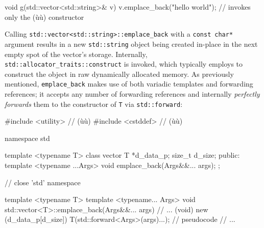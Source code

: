 \begin{emcppslisting}[emcppsbatch=e11]
void g(std::vector<std::string>& v)
{
    v.emplace_back("hello world");
        // invokes only the (ù{}ù) constructor
}
\end{emcppslisting}

\noindent Calling \lstinline!std::vector<std::string>::emplace_back! with a
\lstinline!const!~\lstinline!char*! argument results in a new
\lstinline!std::string! object being created in-place in the next empty
spot of the vector's storage. Internally,
\lstinline!std::allocator_traits::construct! is invoked, which typically
employs  to construct the object in raw
dynamically allocated memory. As previously mentioned,
\lstinline!emplace_back! makes use of both variadic
templates and forwarding references; it accepts any
number of forwarding references and internally \textit{perfectly forwards} them
to the constructor of \lstinline!T! via \lstinline!std::forward!:

\begin{emcppshiddenlisting}[emcppsbatch=e12]
#include <utility>  // (ù{}ù)                                           
#include <cstddef>  // (ù{}ù)                                            
                                                                                
namespace std {                                                                 
                                                                                
template <typename T>                                                           
class vector                                                                    
{                                                                               
    T      *d_data_p;                                                           
    size_t  d_size;                                                             
public:                                                                         
    template <typename ...Args>                                                 
    void emplace_back(Args&&... args);                                          
};                                                                              
                                                                                
} // close 'std' namespace
\end{emcppshiddenlisting}
\begin{emcppslisting}[emcppsbatch=e12]
template <typename T>
template <typename... Args>
void std::vector<T>::emplace_back(Args&&... args)
{
    // ...
    (void) new (d_data_p[d_size]) T(std::forward<Args>(args)...);  // pseudocode
    // ...
}
\end{emcppslisting}

